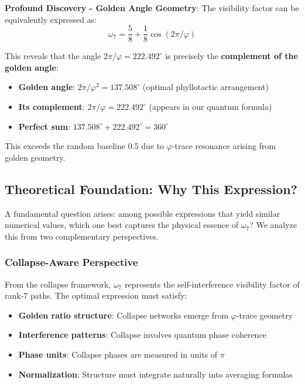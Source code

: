 \documentclass[%
 reprint,
 amsmath,amssymb,
 aps,
 prd,
 10pt,
 nofootinbib,      %
 longbibliography  %
]{revtex4-2}
\theoremstyle{definition}
\theoremstyle{remark}
\begin{document}
\textbf{Profound Discovery - Golden Angle Geometry}: The visibility factor can be equivalently expressed as:
\begin{equation}
\omega_7 = \frac{5}{8} + \frac{1}{8}\cos(2\pi/\varphi)
\end{equation}

This reveals that the angle $2\pi/\varphi = 222.492^\circ$ is precisely the \textbf{complement of the golden angle}:
\begin{itemize}
\item \textbf{Golden angle}: $2\pi/\varphi^2 = 137.508^\circ$ (optimal phyllotactic arrangement)
\item \textbf{Its complement}: $2\pi/\varphi = 222.492^\circ$ (appears in our quantum formula)
\item \textbf{Perfect sum}: $137.508^\circ + 222.492^\circ = 360^\circ$
\end{itemize}

This exceeds the random baseline 0.5 due to $\varphi$-trace resonance arising from golden geometry.

\subsection{Theoretical Foundation: Why This Expression?}

A fundamental question arises: among possible expressions that yield similar numerical values, which one best captures the physical essence of $\omega_7$? We analyze this from two complementary perspectives.

\subsubsection{Collapse-Aware Perspective}

From the collapse framework, $\omega_7$ represents the self-interference visibility factor of rank-7 paths. The optimal expression must satisfy:

\begin{itemize}
\item \textbf{Golden ratio structure}: Collapse networks emerge from $\varphi$-trace geometry
\item \textbf{Interference patterns}: Collapse involves quantum phase coherence
\item \textbf{Phase units}: Collapse phases are measured in units of $\pi$
\item \textbf{Normalization}: Structure must integrate naturally into averaging formulas
\end{itemize}
\end{document}
